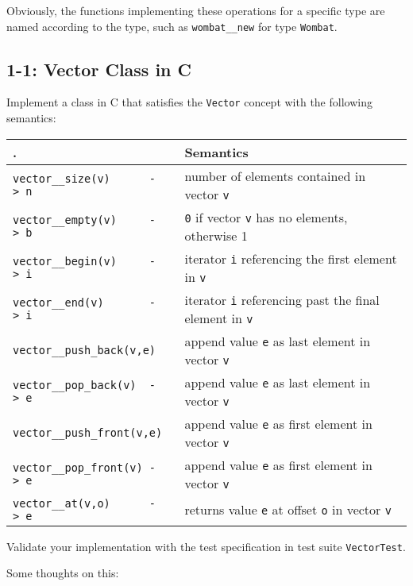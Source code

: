 \documentclass[]{article}
\begin{document}
Obviously, the functions implementing these operations for a specific
type are named according to the type, such as \texttt{wombat\_\_new} for
type \texttt{Wombat}.

\subsection{1-1: Vector Class in C}\label{vector-class-in-c}

Implement a class in C that satisfies the \texttt{Vector} concept with
the following semantics:

\begin{longtable}[c]{@{}ll@{}}
\toprule
. & Semantics \tabularnewline
\midrule
\endhead
\texttt{vector\_\_size(v)\ \ \ \ \ \ -\textgreater{}\ n} & number of
elements contained in vector \texttt{v}\tabularnewline
\texttt{vector\_\_empty(v)\ \ \ \ \ -\textgreater{}\ b} & \texttt{0} if
vector \texttt{v} has no elements, otherwise 1\tabularnewline
\texttt{vector\_\_begin(v)\ \ \ \ \ -\textgreater{}\ i} & iterator
\texttt{i} referencing the first element in \texttt{v}\tabularnewline
\texttt{vector\_\_end(v)\ \ \ \ \ \ \ -\textgreater{}\ i} & iterator
\texttt{i} referencing past the final element in
\texttt{v}\tabularnewline
\texttt{vector\_\_push\_back(v,e)} & append value \texttt{e} as last
element in vector \texttt{v}\tabularnewline
\texttt{vector\_\_pop\_back(v)\ \ -\textgreater{}\ e} & append value
\texttt{e} as last element in vector \texttt{v}\tabularnewline
\texttt{vector\_\_push\_front(v,e)} & append value \texttt{e} as first
element in vector \texttt{v}\tabularnewline
\texttt{vector\_\_pop\_front(v)\ -\textgreater{}\ e} & append value
\texttt{e} as first element in vector \texttt{v}\tabularnewline
\texttt{vector\_\_at(v,o)\ \ \ \ \ \ -\textgreater{}\ e} & returns value
\texttt{e} at offset \texttt{o} in vector \texttt{v}\tabularnewline
\bottomrule
\end{longtable}

Validate your implementation with the test specification in test suite
\texttt{VectorTest}.

Some thoughts on this:
\end{document}

